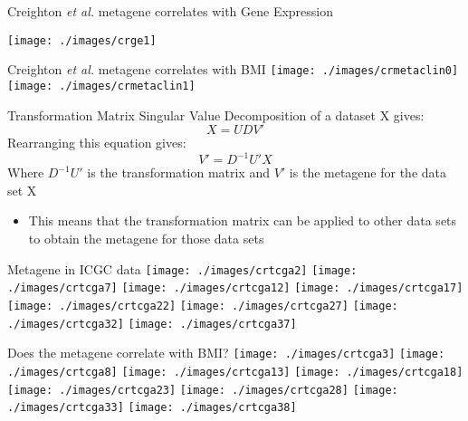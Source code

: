 \documentclass[handout]{beamer}
\begin{document}
\begin{frame}{\normalsize Creighton \textit{et al.} metagene correlates with Gene Expression}
	\begin{center}
		\texttt{[image: ./images/crge1]}
	\end{center}
\end{frame}

\begin{frame}{Creighton \textit{et al.} metagene correlates with BMI}
	\hspace{-4.0ex}
	\texttt{[image: ./images/crmetaclin0]}
	\texttt{[image: ./images/crmetaclin1]}
\end{frame}

\begin{frame}{Transformation Matrix}
	Singular Value Decomposition of a dataset X gives:
	\begin{equation*}
		X = UDV'
	\end{equation*}
	Rearranging this equation gives:
	\begin{equation*}
		V' = D^{-1}U'X
	\end{equation*}
	Where $D^{-1}U'$ is the transformation matrix and $V'$ is the metagene for the data set X
	{\footnotesize
		\begin{itemize}
			\item This means that the transformation matrix can be applied to other data sets to obtain the metagene for those data sets
		\end{itemize}
	}
\end{frame}

\begin{frame}{Metagene in ICGC data}
	\texttt{[image: ./images/crtcga2]}
	\texttt{[image: ./images/crtcga7]}
	\texttt{[image: ./images/crtcga12]}
	\texttt{[image: ./images/crtcga17]}\\
	\texttt{[image: ./images/crtcga22]}
	\texttt{[image: ./images/crtcga27]}
	\texttt{[image: ./images/crtcga32]}
	\texttt{[image: ./images/crtcga37]}
\end{frame}

\begin{frame}{Does the metagene correlate with BMI?}
	\texttt{[image: ./images/crtcga3]}
	\texttt{[image: ./images/crtcga8]}
	\texttt{[image: ./images/crtcga13]}
	\texttt{[image: ./images/crtcga18]}\\
	\texttt{[image: ./images/crtcga23]}
	\texttt{[image: ./images/crtcga28]}
	\texttt{[image: ./images/crtcga33]}
	\texttt{[image: ./images/crtcga38]}
\end{frame}
\end{document}
